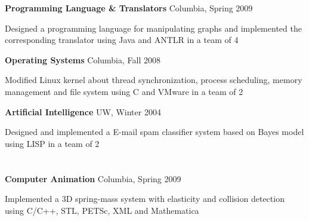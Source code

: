 \documentclass[margin,line]{resume}
\begin{document}
\begin{resume}
    \textbf{Programming Language \& Translators} \hfill Columbia, Spring 2009  \vspace{-3mm}\\\vspace{-1mm}%
      \begin{list2}
      \item Designed a programming language for manipulating graphs and implemented the corresponding translator using Java and ANTLR in a team of 4 
      \end{list2}

    \textbf{Operating Systems} \hfill Columbia, Fall 2008  \vspace{-3mm}\\\vspace{-1mm}%
      \begin{list2}
      \item Modified Linux kernel about thread synchronization, process scheduling, memory management and file system using C and VMware in a team of 2 
      \end{list2}

      

    \textbf{Artificial Intelligence} \hfill UW, Winter 2004  \vspace{-3mm}\\\vspace{-1mm}%
      \begin{list2}
      \item Designed and implemented a E-mail spam classifier system based on Bayes model using LISP in a team of 2 
      \end{list2}

      

    \section{\mysidestyle [Graphics]} 

    \textbf{Computer Animation} \hfill Columbia, Spring 2009  \vspace{-3mm}\\\vspace{-1mm}%
      \begin{list2}
      \item Implemented a 3D spring-mass system with elasticity and collision detection using C/C++, STL, PETSc, XML and Mathematica       
      \end{list2}



\end{resume}
\end{document}
